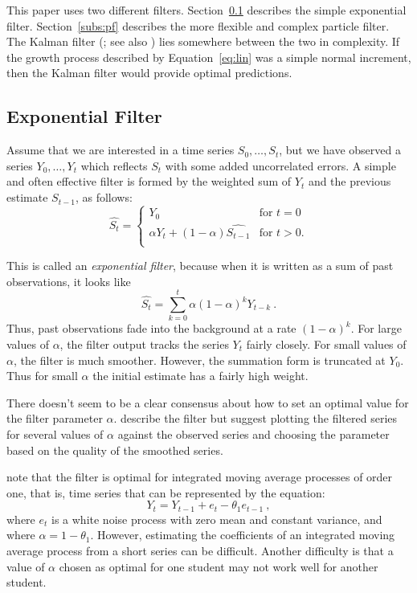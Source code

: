 \documentclass[12pt]{RR-article}
\begin{document}
This paper uses two different filters.  Section~\ref{subs:expf}
describes the simple exponential filter.  Section~\ref{subs:pf}
describes the more flexible and complex particle filter.  The Kalman
filter (; see also
) lies somewhere between the two in
complexity.  If the growth process described by Equation~\ref{eq:lin}
was a simple normal increment, then the Kalman filter would provide
optimal predictions.

\subsection{Exponential Filter}
\label{subs:expf}

Assume that we are interested in a time series $S_0,\ldots,S_t$, but
we have observed a series $Y_0,\ldots,Y_t$ which reflects $S_t$ with
some added uncorrelated errors.  A simple and often effective filter
is formed by the weighted sum of $Y_t$ and the previous estimate $\hat
{S_{t-1}}$, as follows:
\begin{equation}
\label{eq:expf}
\hat {S_{t}} = 
\begin{cases}
Y_0 & \mbox{for } t=0 \\
\alpha Y_t + (1-\alpha)\hat{S_{t-1}} & \mbox{for } t>0.\\
\end{cases}
\end{equation}

This is called an \textit{exponential filter}, because when it is
written as a sum of past observations, it looks like
\[
\hat {S_{t}} = \sum_{k=0}^t \alpha (1-\alpha)^k Y_{t-k} \ .
\]
Thus, past observations fade into the background at a rate
$(1-\alpha)^k$.  For large values of $\alpha$, the filter output tracks
the series $Y_t$ fairly closely.  For small values of $\alpha$, the
filter is much smoother.  However, the summation form is
truncated at $Y_0$.  Thus for small $\alpha$ the initial estimate has
a fairly high weight.

There doesn't seem to be a clear consensus about how to set an optimal
value for the filter parameter $\alpha$.  
describe the filter but suggest plotting the filtered series for
several values of $\alpha$ against the observed series and choosing
the parameter based on the quality of the smoothed series.

 note that the filter is optimal for integrated
moving average processes of order one, that is, time series that can be
represented by the equation:
\begin{equation}
\label{eq:ima}
Y_t = Y_{t-1} + e_t - \theta_1 e_{t-1} \ ,
\end{equation}
where $e_t$ is a white noise process with zero mean and constant
variance, and where $\alpha = 1-\theta_1$.  However,
estimating the coefficients of an integrated moving average process
from a short series can be difficult.  Another difficulty is that a
value of $\alpha$ chosen as optimal for one student may not
work well for another student.
\end{document}
